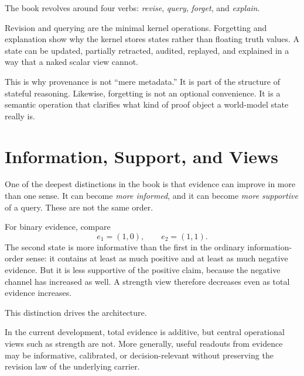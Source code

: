 \documentclass[11pt,openany]{report}
\begin{document}
The book revolves around four verbs:
\emph{revise}, \emph{query}, \emph{forget}, and \emph{explain}.

Revision and querying are the minimal kernel operations.  Forgetting and
explanation show why the kernel stores states rather than floating truth values.
A state can be updated, partially retracted, audited, replayed, and explained in
a way that a naked scalar view cannot.


This is why provenance is not ``mere metadata.''  It is part of the structure of
stateful reasoning.  Likewise, forgetting is not an optional convenience.  It is a
semantic operation that clarifies what kind of proof object a world-model
state really is.

\section{Information, Support, and Views}
\label{sec:overview-views}

One of the deepest distinctions in the book is that evidence can improve in
more than one sense.  It can become \emph{more informed}, and it can become
\emph{more supportive} of a query.  These are not the same order.

For binary evidence, compare
\[
  e_1 = (1,0),
  \qquad
  e_2 = (1,1).
\]
The second state is more informative than the first in the ordinary
information-order sense: it contains at least as much positive and at least as
much negative evidence.  But it is less supportive of the positive claim,
because the negative channel has increased as well.  A strength view therefore
decreases even as total evidence increases.

This distinction drives the architecture.

\begin{proposition}
\label{prop:overview-views-not-semantic-core}
In the current development, total evidence is additive, but central operational
views such as strength are not.  More generally, useful readouts from evidence
may be informative, calibrated, or decision-relevant without preserving the
revision law of the underlying carrier.
\end{proposition}
\end{document}
